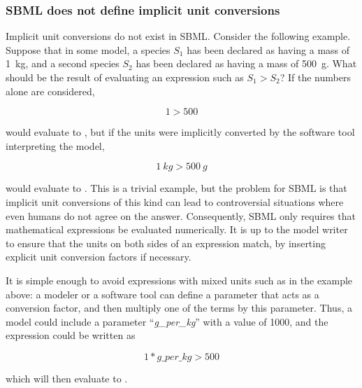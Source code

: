 \subsubsection{SBML does not define implicit unit conversions}
\label{sec:no-implicit-conversions}

Implicit unit conversions do not exist in SBML.  Consider the
following example.  Suppose that in some model, a species $S_1$
has been declared as having a mass of 1~kg, and a second species
$S_2$ has been declared as having a mass of 500~g.  What should be
the result of evaluating an expression such as $S_1 > S_2$?  If
the numbers alone are considered,
\begin{linenomath}
  \begin{equation*}
    1 > 500
  \end{equation*}
\end{linenomath}
would evaluate to , but if the units were implicitly
converted by the software tool interpreting the model,
\begin{linenomath}
  \begin{equation*}
    1~kg > 500~g
  \end{equation*}
\end{linenomath}
would evaluate to .  This is a trivial example, but the
problem for SBML is that implicit unit conversions of this kind
can lead to controversial situations where even humans do not
agree on the answer.  Consequently, SBML only requires that
mathematical expressions be evaluated numerically.  It is up to
the model writer to ensure that the units on both sides of an
expression match, by inserting explicit unit conversion factors if
necessary.

It is simple enough to avoid expressions with mixed units such as
in the example above: a modeler or a software tool can define a
parameter that acts as a conversion factor, and then multiply one
of the terms by this parameter.  Thus, a model could include a
parameter ``\emph{g\_per\_kg}'' with a value of 1000, and the
expression could be written as
\begin{linenomath}
  \begin{equation*}
    1 * g\_per\_kg > 500
  \end{equation*}
\end{linenomath}
which will then evaluate to .




